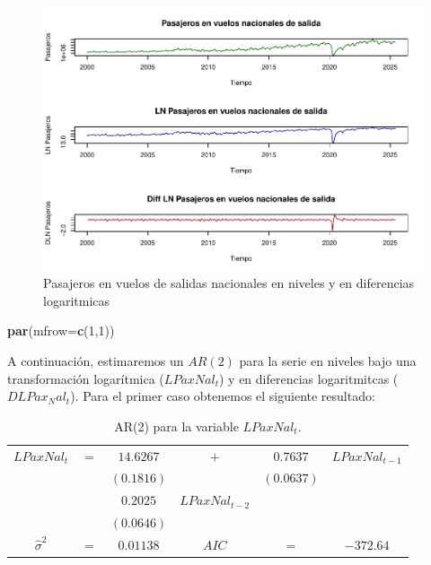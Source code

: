 \documentclass[
]{book}
\newenvironment{Shaded}{\begin{snugshade}}{\end{snugshade}}
\newcommand{\AttributeTok}[1]{\textcolor[rgb]{0.13,0.29,0.53}{#1}}
\newcommand{\DecValTok}[1]{\textcolor[rgb]{0.00,0.00,0.81}{#1}}
\newcommand{\FunctionTok}[1]{\textcolor[rgb]{0.13,0.29,0.53}{\textbf{#1}}}
\newcommand{\NormalTok}[1]{#1}
\begin{document}
\begin{figure}

{\centering \includegraphics{Notas-Series-Tiempo_files/figure-latex/fig47-1} 

}

\caption{Pasajeros en vuelos de salidas nacionales en niveles y en diferencias logaritmicas}\label{fig:fig47}
\end{figure}

\begin{Shaded}
\begin{Highlighting}[]
\FunctionTok{par}\NormalTok{(}\AttributeTok{mfrow=}\FunctionTok{c}\NormalTok{(}\DecValTok{1}\NormalTok{,}\DecValTok{1}\NormalTok{))}
\end{Highlighting}
\end{Shaded}

A continuación, estimaremos un \(AR(2)\) para la serie en niveles bajo una transformación logarítmica (\(LPaxNal_t\)) y en diferencias logaritmitcas (\(DLPax_Nal_t\)). Para el primer caso obtenemos el siguiente resultado:

\begin{longtable}[]{@{}cccccc@{}}
\caption{\label{tab:AR02} AR(2) para la variable \(LPaxNal_t\).}\tabularnewline
\toprule\noalign{}
\endfirsthead
\endhead
\bottomrule\noalign{}
\endlastfoot
\(LPaxNal_t\) & \(=\) & \(14.6267\) & \(+\) & \(0.7637\) & \(LPaxNal_{t-1}\) \\
& & \((0.1816)\) & & \((0.0637)\) & \\
& & \(0.2025\) & \(LPaxNal_{t-2}\) & & \\
& & \((0.0646)\) & & & \\
\(\hat{\sigma}^2\) & \(=\) & \(0.01138\) & \(AIC\) & \(=\) & \(-372.64\) \\
\end{longtable}
\end{document}
